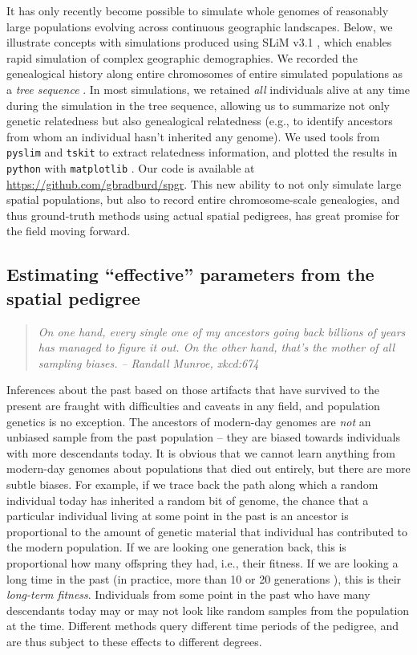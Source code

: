 \documentclass{ar-1col}
\renewcommand{\emph}[1]{{\textit{#1}}}
\begin{document}
It has only recently become possible to simulate whole genomes
of reasonably large populations
evolving across continuous geographic landscapes.
Below, 
we illustrate concepts with 
simulations 
produced using SLiM v3.1 \citep{haller2018forward},
which enables rapid simulation of complex geographic demographies.
We recorded the genealogical history along entire chromosomes
of entire simulated populations
as a \emph{tree sequence} \citep{haller2018treesequence}.
In most simulations, we retained \emph{all} individuals alive at any time during the simulation
in the tree sequence, allowing us to summarize not only genetic relatedness
but also genealogical relatedness 
(e.g., to identify ancestors from whom an individual hasn't inherited any genome).
We used tools from \texttt{pyslim} and \texttt{tskit} \citep{kelleher2018efficient} 
to extract relatedness information,
and plotted the results in \texttt{python} with \texttt{matplotlib} \citep{hunter2007matplotlib}.
Our code is available at \url{https://github.com/gbradburd/spgr}.
This new ability to not only simulate large spatial populations,
but also to record entire chromosome-scale genealogies,
and thus ground-truth methods using actual spatial pedigrees,
has great promise for the field moving forward.


\subsection{Estimating ``effective'' parameters from the spatial pedigree}

\begin{quote}
    \textit{
    On one hand, every single one of my ancestors going back billions of years
    has managed to figure it out.
    On the other hand, that's the mother of all sampling biases.}
    \hfill \textit{-- Randall Munroe, xkcd:674}
\end{quote}

Inferences about the past
based on those artifacts that have survived to the present
are fraught with difficulties and caveats in any field, 
and population genetics is no exception.
The ancestors of modern-day genomes are \emph{not} an unbiased sample
from the past population -- 
they are biased towards individuals with more descendants today.
It is obvious that we cannot learn anything from modern-day genomes
about populations that died out entirely, 
but there are more subtle biases.
For example, if we trace back the path along which a random individual today 
has inherited a random bit of genome,
the chance that a particular individual living at some point in the past is an ancestor
is proportional to the amount of genetic material that individual has contributed to the modern population.
If we are looking one generation back, 
this is proportional how many offspring they had, i.e., their fitness.
If we are looking a long time in the past
(in practice, more than 10 or 20 generations \citep{BartonEtheridge2011fitness}),
this is their \emph{long-term fitness}.
Individuals from some point in the past who have many descendants today
may or may not look like random samples from the population at the time.
Different methods query different time periods of the pedigree,
and are thus subject to these effects to different degrees.
\end{document}
